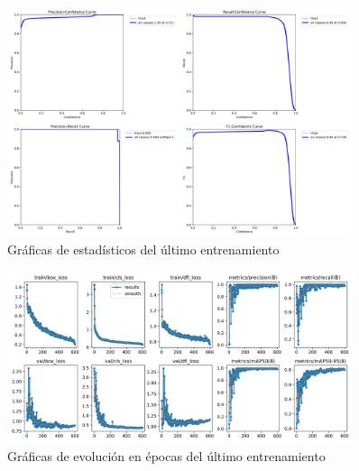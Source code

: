 \begin{itemize}
    \begin{figure}[H]
        \centering
        \includegraphics[width=0.9\textwidth]{images/13/b/final/graficas2.png}
        \caption{Gráficas de estadísticos del último entrenamiento}
        \label{fig:EstadisticosFinal}
    \end{figure}
    \begin{figure}[H]
        \centering
        \includegraphics[width=0.9\textwidth]{images/13/b/final/results.png}
        \caption{Gráficas de evolución en épocas del último entrenamiento}
        \label{fig:ResultadosFinal}
    \end{figure}
\end{itemize}

\clearpage

